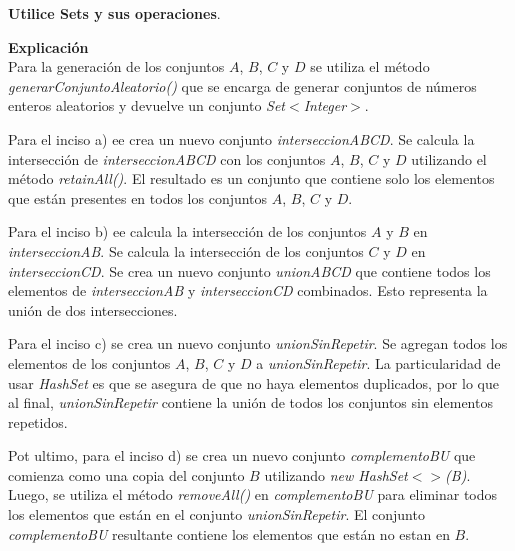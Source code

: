 \documentclass[11pt, twocolumn]{article}
\begin{document}
  \textbf{Utilice Sets y sus operaciones}.

  \textbf{Explicación} \\
  Para la generación de los conjuntos $A$, $B$, $C$ y $D$ se utiliza el método \textit{generarConjuntoAleatorio()} que se encarga de generar conjuntos de números enteros aleatorios y devuelve un conjunto \textit{Set$<$Integer$>$}. 
  
  Para el inciso a) ee crea un nuevo conjunto \textit{interseccionABCD}.
  Se calcula la intersección de \textit{interseccionABCD} con los conjuntos $A$, $B$, $C$ y $D$ utilizando el método \textit{retainAll()}. El resultado es un conjunto que contiene solo los elementos que están presentes en todos los conjuntos $A$, $B$, $C$ y $D$.

  Para el inciso b) ee calcula la intersección de los conjuntos $A$ y $B$ en \textit{interseccionAB}. Se calcula la intersección de los conjuntos $C$ y $D$ en \textit{interseccionCD}. Se crea un nuevo conjunto \textit{unionABCD} que contiene todos los elementos de \textit{interseccionAB} y \textit{interseccionCD} combinados. Esto representa la unión de dos intersecciones.

  Para el inciso c) se crea un nuevo conjunto \textit{unionSinRepetir}. Se agregan todos los elementos de los conjuntos $A$, $B$, $C$ y $D$ a \textit{unionSinRepetir}. La particularidad de usar \textit{HashSet} es que se asegura de que no haya elementos duplicados, por lo que al final, \textit{unionSinRepetir} contiene la unión de todos los conjuntos sin elementos repetidos.

  Pot ultimo, para el inciso d) se crea un nuevo conjunto \textit{complementoBU} que comienza como una copia del conjunto $B$ utilizando \textit{new HashSet$<>$(B)}. Luego, se utiliza el método \textit{removeAll()} en \textit{complementoBU} para eliminar todos los elementos que están en el conjunto \textit{unionSinRepetir}. El conjunto \textit{complementoBU} resultante contiene los elementos que están no estan en $B$.
\end{document}
